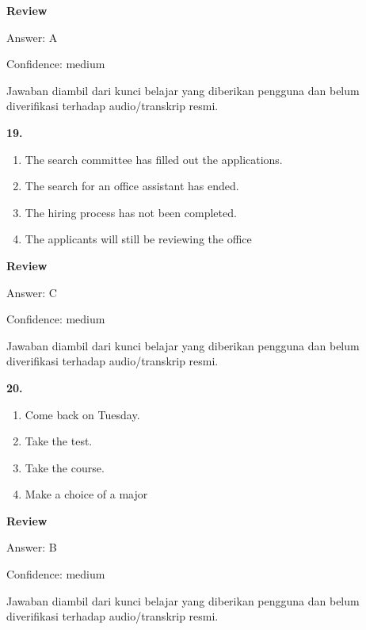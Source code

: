 \documentclass[12pt]{article}
\begin{document}
\par
\begingroup
\setlength{\parskip}{0pt}
\setlength{\parindent}{0pt}
\textbf{Review}\par
Answer: A\par
Confidence: medium\par
Jawaban diambil dari kunci belajar yang diberikan pengguna dan belum diverifikasi terhadap audio/transkrip resmi.\par
\endgroup
\par
\vspace{0.25\baselineskip}
\noindent\textbf{19.}
\begin{enumerate}[label=(\Alph*),leftmargin=*,itemsep=0.2em]
\item The search committee has filled out the applications.
\item The search for an office assistant has ended.
\item The hiring process has not been completed.
\item The applicants will still be reviewing the office
\end{enumerate}
\par
\begingroup
\setlength{\parskip}{0pt}
\setlength{\parindent}{0pt}
\textbf{Review}\par
Answer: C\par
Confidence: medium\par
Jawaban diambil dari kunci belajar yang diberikan pengguna dan belum diverifikasi terhadap audio/transkrip resmi.\par
\endgroup
\par
\vspace{0.25\baselineskip}
\noindent\textbf{20.}
\begin{enumerate}[label=(\Alph*),leftmargin=*,itemsep=0.2em]
\item Come back on Tuesday.
\item Take the test.
\item Take the course.
\item Make a choice of a major
\end{enumerate}
\par
\begingroup
\setlength{\parskip}{0pt}
\setlength{\parindent}{0pt}
\textbf{Review}\par
Answer: B\par
Confidence: medium\par
Jawaban diambil dari kunci belajar yang diberikan pengguna dan belum diverifikasi terhadap audio/transkrip resmi.\par
\endgroup
\par
\end{document}
